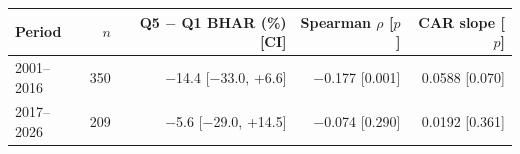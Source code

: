 \begin{tabular}{lrrrr}
\toprule
Period & $n$ & Q5 $-$ Q1 BHAR (\%) [CI] & Spearman $\rho$ [$p$] & CAR slope [$p$] \\
\midrule
2001--2016 & 350 & $-$14.4 [$-$33.0, +6.6] & $-$0.177 [0.001] & 0.0588 [0.070] \\
2017--2026 & 209 & $-$5.6 [$-$29.0, +14.5] & $-$0.074 [0.290] & 0.0192 [0.361] \\
\bottomrule
\end{tabular}
